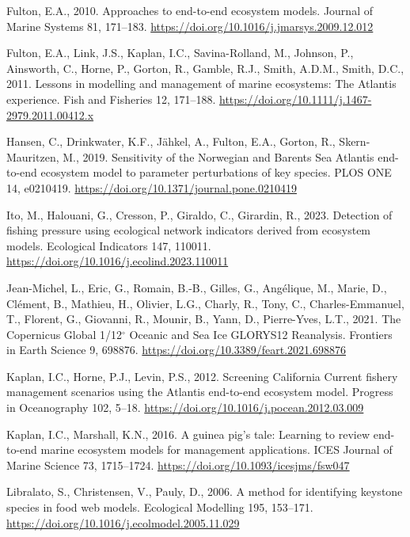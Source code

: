 \documentclass[
]{article}
\newlength{\cslhangindent}
\newenvironment{CSLReferences}[2] %
 {\begin{list}{}{%
  \setlength{\itemindent}{0pt}
  \setlength{\leftmargin}{0pt}
  \setlength{\parsep}{0pt}
  \ifodd #1
   \setlength{\leftmargin}{\cslhangindent}
   \setlength{\itemindent}{-1\cslhangindent}
  \fi
  \setlength{\itemsep}{#2\baselineskip}}}
 {\end{list}}
\begin{document}
\begin{CSLReferences}{1}{0}
Fulton, E.A., 2010. Approaches to end-to-end ecosystem models. Journal of Marine Systems 81, 171--183. \url{https://doi.org/10.1016/j.jmarsys.2009.12.012}

Fulton, E.A., Link, J.S., Kaplan, I.C., Savina-Rolland, M., Johnson, P., Ainsworth, C., Horne, P., Gorton, R., Gamble, R.J., Smith, A.D.M., Smith, D.C., 2011. Lessons in modelling and management of marine ecosystems: The {Atlantis} experience. Fish and Fisheries 12, 171--188. \url{https://doi.org/10.1111/j.1467-2979.2011.00412.x}

Hansen, C., Drinkwater, K.F., Jähkel, A., Fulton, E.A., Gorton, R., Skern-Mauritzen, M., 2019. Sensitivity of the {Norwegian} and {Barents Sea Atlantis} end-to-end ecosystem model to parameter perturbations of key species. PLOS ONE 14, e0210419. \url{https://doi.org/10.1371/journal.pone.0210419}

Ito, M., Halouani, G., Cresson, P., Giraldo, C., Girardin, R., 2023. Detection of fishing pressure using ecological network indicators derived from ecosystem models. Ecological Indicators 147, 110011. \url{https://doi.org/10.1016/j.ecolind.2023.110011}

Jean-Michel, L., Eric, G., Romain, B.-B., Gilles, G., Angélique, M., Marie, D., Clément, B., Mathieu, H., Olivier, L.G., Charly, R., Tony, C., Charles-Emmanuel, T., Florent, G., Giovanni, R., Mounir, B., Yann, D., Pierre-Yves, L.T., 2021. The {Copernicus Global} 1/12{\(^\circ\)} {Oceanic} and {Sea Ice GLORYS12 Reanalysis}. Frontiers in Earth Science 9, 698876. \url{https://doi.org/10.3389/feart.2021.698876}

Kaplan, I.C., Horne, P.J., Levin, P.S., 2012. Screening {California Current} fishery management scenarios using the {Atlantis} end-to-end ecosystem model. Progress in Oceanography 102, 5--18. \url{https://doi.org/10.1016/j.pocean.2012.03.009}

Kaplan, I.C., Marshall, K.N., 2016. A guinea pig's tale: Learning to review end-to-end marine ecosystem models for management applications. ICES Journal of Marine Science 73, 1715--1724. \url{https://doi.org/10.1093/icesjms/fsw047}

Libralato, S., Christensen, V., Pauly, D., 2006. A method for identifying keystone species in food web models. Ecological Modelling 195, 153--171. \url{https://doi.org/10.1016/j.ecolmodel.2005.11.029}


\end{CSLReferences}
\end{document}
